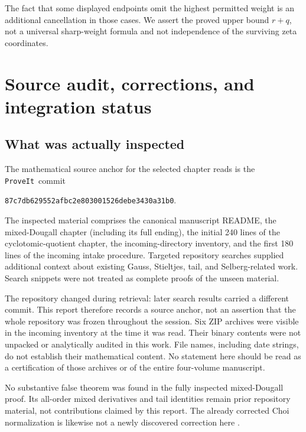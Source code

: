 \documentclass[11pt,letterpaper]{article}
\numberwithin{equation}{section}
\theoremstyle{definition}\newtheorem{definition}[theorem]{Definition}
\theoremstyle{remark}\newtheorem{remark}[theorem]{Remark}
\newcommand{\repo}{\texttt{ProveIt}}
\begin{document}
The fact that some displayed endpoints omit the highest permitted
weight is an additional cancellation in those cases. We assert the
proved upper bound $r+q$, not a universal sharp-weight formula and
not independence of the surviving zeta coordinates.


\section{Source audit, corrections, and integration status}
\label{dhr:sec:audit}

\subsection{What was actually inspected}
The mathematical source anchor for the selected chapter reads is the
\repo\ commit
\begin{center}
\texttt{87c7db629552afbc2e803001526debe3430a31b0}.
\end{center}
The inspected material comprises the canonical manuscript README,
the mixed-Dougall chapter (including its full ending), the initial
240 lines of the cyclotomic-quotient chapter, the incoming-directory
inventory, and the first 180 lines of the incoming intake procedure.
Targeted repository searches supplied additional context about existing
Gauss, Stieltjes, tail, and Selberg-related work. Search snippets were
not treated as complete proofs of the unseen material.

The repository changed during retrieval: later search results carried
a different commit. This report therefore records a source anchor,
not an assertion that the whole repository was frozen throughout the
session. Six ZIP archives were visible in the incoming inventory at
the time it was read. Their binary contents were not unpacked or
analytically audited in this work. File names, including date strings,
do not establish their mathematical content. No statement here should
be read as a certification of those archives or of the entire four-volume
manuscript.

No substantive false theorem was found in the fully inspected
mixed-Dougall proof. Its all-order mixed derivatives and tail identities
remain prior repository material, not contributions claimed by this
report. The already corrected Choi normalization is likewise not a
newly discovered correction here \cite{repo:readme,repo:dougall}.
\end{document}
